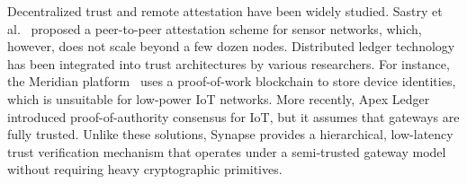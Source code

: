 Decentralized trust and remote attestation have been widely studied. Sastry et al.~\cite{sastry2023peer} proposed a peer-to-peer attestation scheme for sensor networks, which, however, does not scale beyond a few dozen nodes. Distributed ledger technology has been integrated into trust architectures by various researchers. For instance, the Meridian platform~\cite{meridian2025} uses a proof-of-work blockchain to store device identities, which is unsuitable for low-power IoT networks. More recently, Apex Ledger~\cite{apexledger2024} introduced proof-of-authority consensus for IoT, but it assumes that gateways are fully trusted. Unlike these solutions, Synapse provides a hierarchical, low-latency trust verification mechanism that operates under a semi-trusted gateway model without requiring heavy cryptographic primitives.
